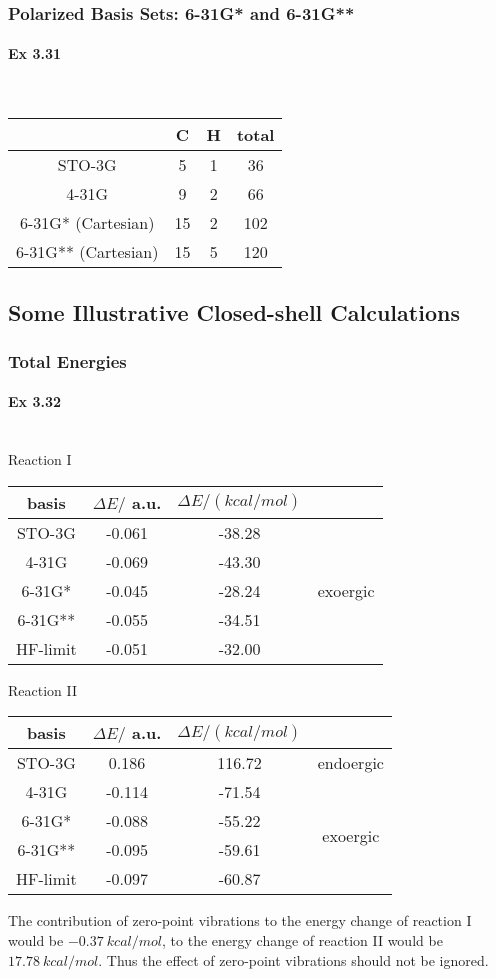 \documentclass[a4paper]{article}
\newcommand{\ex}[1]{\paragraph{Ex #1}}
\numberwithin{equation}{subsection}
\begin{document}
\subsubsection{Polarized Basis Sets: 6-31G* and 6-31G**}
\ex{3.31}
~\\
\begin{table}[H]
	\centering
	\begin{tabular}{cccc}
		\hline
		 & C & H & total\\ \hline
		STO-3G & 5 & 1 & 36\\
		4-31G & 9 & 2 & 66\\
		6-31G* (Cartesian) & 15 & 2 & 102\\
		6-31G** (Cartesian) & 15 & 5 & 120\\
		\hline
	\end{tabular}
\end{table}

\subsection{Some Illustrative Closed-shell Calculations}
\subsubsection{Total Energies}
\ex{3.32}~\\
Reaction I
\begin{table}[H]
	\begin{tabular}{ccc|c}
		\hline
		basis & $ \Delta E /  $ a.u.& $ \Delta E /(\si{kcal/mol}) $& \\
		\hline
		STO-3G   & -0.061 & -38.28 &\\
		4-31G    & -0.069 & -43.30 &\\
		6-31G*   & -0.045 & -28.24 & exoergic\\ 
		6-31G**  & -0.055 &	-34.51 & \\
		HF-limit & -0.051 & -32.00 &\\
		\hline		
	\end{tabular}
\end{table}
Reaction II
\begin{table}[H]
	\begin{tabular}{ccc|c}
		\hline
		basis & $ \Delta E /  $ a.u.& $ \Delta E /(\si{kcal/mol}) $ &\\
		\hline
		STO-3G   &  0.186 &	116.72 & endoergic	\\ \cline{4-4}
		4-31G    & -0.114 &	-71.54 & \multirow{4}{*}{exoergic}\\
		6-31G*   & -0.088 &	-55.22 &\\
		6-31G**  & -0.095 &	-59.61 &\\
		HF-limit & -0.097 &	-60.87 &\\
		\hline	
	\end{tabular}
\end{table}
The contribution of zero-point vibrations to the energy change of reaction I would be $ \SI{-0.37}{kcal/mol} $, to the energy change of reaction II would be $ \SI{17.78}{kcal/mol} $. Thus the effect of zero-point vibrations should not be ignored.
\end{document}
